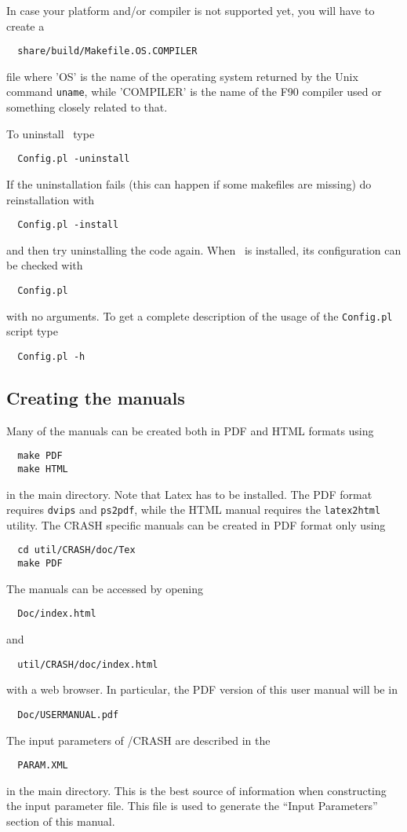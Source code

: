 In case your platform and/or compiler is not supported yet, 
you will have to create a
\begin{verbatim}
  share/build/Makefile.OS.COMPILER
\end{verbatim}
file where 'OS' is the name of the operating system returned
by the Unix command {\tt uname}, while 'COMPILER' is the name
of the F90 compiler used or something closely related to that.

To uninstall \BATSRUS\ type
\begin{verbatim}
  Config.pl -uninstall
\end{verbatim}
If the uninstallation fails (this can happen if some makefiles are missing)
do reinstallation with
\begin{verbatim}
  Config.pl -install
\end{verbatim}
and then try uninstalling the code again.
When \BATSRUS\ is installed, its configuration can be checked with
\begin{verbatim}
  Config.pl
\end{verbatim}
with no arguments. 
To get a complete description of the usage of the 
{\tt Config.pl} script type
\begin{verbatim}
  Config.pl -h
\end{verbatim}

\subsection{Creating the manuals}

Many of the manuals can be created both in PDF and HTML formats using
\begin{verbatim}
  make PDF
  make HTML
\end{verbatim}
in the main directory. Note that Latex has to be installed. 
The PDF format requires {\tt dvips} and {\tt ps2pdf}, while the HTML manual requires the
{\tt latex2html} utility. The CRASH specific manuals can be created in PDF format only using
\begin{verbatim}
  cd util/CRASH/doc/Tex
  make PDF
\end{verbatim}
The manuals can be accessed by opening 
\begin{verbatim}
  Doc/index.html
\end{verbatim}
and
\begin{verbatim}
  util/CRASH/doc/index.html
\end{verbatim}
with a web browser. In particular, the PDF version of this user manual will be in
\begin{verbatim}
  Doc/USERMANUAL.pdf
\end{verbatim}
The input parameters of \BATSRUS/CRASH are described in the
\begin{verbatim}
  PARAM.XML
\end{verbatim}
in the main directory. This is the best source of information when constructing the input
parameter file. This file is used to generate the ``Input Parameters'' section of this manual.

